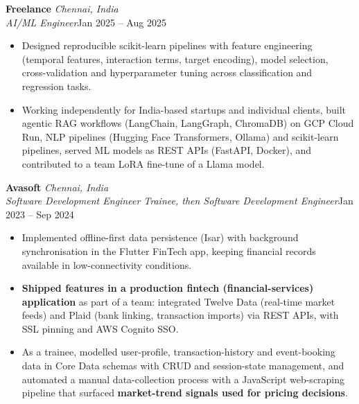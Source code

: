 \documentclass[a4paper,11pt]{article}
\newcommand{\role}[4]{%
  \textbf{#1}{\color{muted}\,\textperiodcentered\,\textit{#2}}\\
  \textit{#4}\hfill{\color{muted}#3}\par}
\newcommand{\gap}{\vspace{5pt}}
\newcommand{\num}[1]{\textbf{#1}}   %
\begin{document}
\gap
{}
\role{Freelance}{Chennai, India}{Jan 2025 – Aug 2025}{AI/ML Engineer}
\begin{itemize}
  \item Designed reproducible scikit-learn pipelines with feature engineering (temporal features, interaction terms, target encoding), model selection, cross-validation and hyperparameter tuning across classification and regression tasks.
  \item Working independently for India-based startups and individual clients, built agentic RAG workflows (LangChain, LangGraph, ChromaDB) on GCP Cloud Run, NLP pipelines (Hugging Face Transformers, Ollama) and scikit-learn pipelines, served ML models as REST APIs (FastAPI, Docker), and contributed to a team LoRA fine-tune of a Llama model.
\end{itemize}
\gap
{}
\role{Avasoft}{Chennai, India}{Jan 2023 – Sep 2024}{Software Development Engineer Trainee, then Software Development Engineer}
\begin{itemize}
  \item Implemented offline-first data persistence (Isar) with background synchronisation in the Flutter FinTech app, keeping financial records available in low-connectivity conditions.
  \item \num{Shipped features in a production fintech (financial-services) application} as part of a team: integrated Twelve Data (real-time market feeds) and Plaid (bank linking, transaction imports) via REST APIs, with SSL pinning and AWS Cognito SSO.
  \item As a trainee, modelled user-profile, transaction-history and event-booking data in Core Data schemas with CRUD and session-state management, and automated a manual data-collection process with a JavaScript web-scraping pipeline that surfaced \num{market-trend signals used for pricing decisions}.
\end{itemize}
\end{document}
